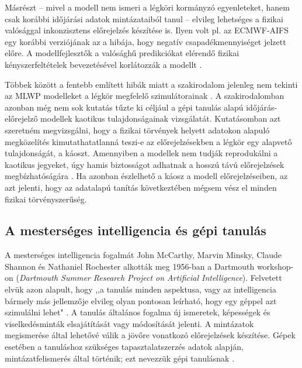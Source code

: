 \documentclass[12pt,a4paper]{article}
\begin{document}
Másrészt -- mivel a modell nem ismeri a légköri kormányzó egyenleteket, hanem csak korábbi időjárási adatok mintázataiból tanul -- elvileg lehetséges a fizikai valósággal inkonzisztens előrejelzés készítése is. Ilyen volt pl. az ECMWF-AIFS egy korábbi verziójának az a hibája, hogy negatív csapadékmennyiséget jelzett előre. A modellfejlesztők a valósághű predikciókat elérendő fizikai kényszerfeltételek bevezetésével korlátozzák a modellt \cite{moldovan_update_2025}. 

Többek között a fentebb említett hibák miatt a szakirodalom jelenleg nem tekinti az MLWP modelleket a légkör megfelelő szimulátorainak \cite{bonavita_limitations_2024}. A szakirodalomban azonban még nem sok kutatás tűzte ki céljául a gépi tanulás alapú időjárás-előrejelző modellek kaotikus tulajdonságainak vizsgálatát. Kutatásomban azt szeretném megvizsgálni, hogy a fizikai törvények helyett adatokon alapuló megközelítés kimutathatatlanná teszi-e az előrejelzésekben a légkör egy alapvető tulajdonságát, a káoszt. Amennyiben a modellek nem tudják reprodukálni a kaotikus jegyeket, úgy hamis biztosságot adhatnak a hosszú távú előrejelzések megbízhatóságára \cite{selz_can_2023}. Ha azonban észlelhető a káosz a modell előrejelzéseiben, az azt jelenti, hogy az adatalapú tanítás következtében mégsem vész el minden fizikai törvényszerűség.

\subsection{A mesterséges intelligencia és gépi tanulás}

A mesterséges intelligencia fogalmát John McCarthy, Marvin Minsky, Claude Shannon és Nathaniel Rochester alkották meg 1956-ban a Dartmouth workshop-on (\textit{Dartmouth Summer Research Project on Artificial Intelligence}). Felvetett elvük azon alapult, hogy ,,a tanulás minden aspektusa, vagy az intelligencia bármely más jellemzője elvileg olyan pontosan leírható, hogy egy géppel azt szimulálni lehet" \cite{moor_dartmouth_2006,choi_introduction_2020}. A tanulás általános fogalma új ismeretek, képességek és viselkedésminták elsajátítását vagy módosítását jelenti. A mintázatok megismerése által lehetővé válik a jövőre vonatkozó előrejelzések készítése. Gépek esetében a tanuláshoz szükséges tapasztalatszerzés adatok alapján, mintázatfelismerés által történik; ezt nevezzük gépi tanulásnak \cite{alzubi_machine_2018}. 
\end{document}
